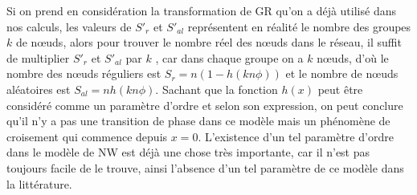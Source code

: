 Si on prend en considération la transformation de GR  qu'on a déjà utilisé dans nos calculs, les valeurs de $S'_{r}$ et $S'_{al}$ représentent en réalité le nombre des groupes $k$ de nœuds,
alors pour trouver le nombre réel des nœuds dans le réseau, il suffit de multiplier $S'_{r}$ et $S'_{al}$  par $k$
, car dans chaque groupe on a $k$ nœuds, d'où le nombre des nœuds réguliers est $S_r=n(1-h(kn\phi))$ et le nombre de nœuds 
aléatoires est $S_{al}=n h(kn\phi)$.
Sachant que la fonction $h(x)$ peut être considéré comme un paramètre d'ordre et selon son expression, on peut conclure qu'il n'y a pas une transition de phase dans ce modèle mais un phénomène de croisement qui commence depuis $x=0$. L'existence d'un tel paramètre d'ordre dans le modèle de NW est déjà une chose très importante, car il n'est pas toujours facile de le trouve, ainsi l'absence  d'un tel paramètre de ce modèle dans la littérature.  

